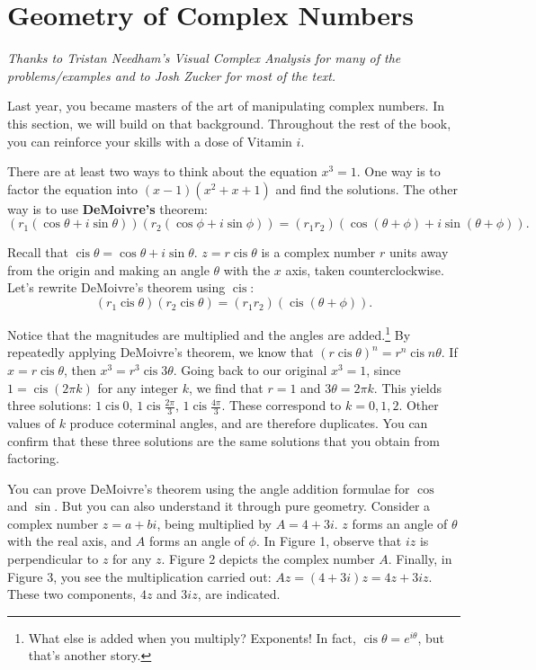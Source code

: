 \documentclass[../gatm.tex]{subfiles}
\begin{document}

\section{Geometry of Complex Numbers}

\newcommand{\Arg} {\operatorname{Arg}}
\newcommand{\cis} {\operatorname{cis}}
\newcommand{\Real} {\operatorname{Re}}
\newcommand{\Imag} {\operatorname{Im}}

\textit{Thanks to Tristan Needham's \emph{Visual Complex Analysis} for many of the problems/examples and to Josh Zucker for most of the text.}

Last year, you became masters of the art of manipulating complex numbers. In this section, we will build on that background. Throughout the rest of the book, you can reinforce your skills with a dose of Vitamin $i$.

There are at least two ways to think about the equation $x^3 = 1$. One way is to factor the equation into $(x-1)(x^2+x+1)$ and find the solutions. The other way is to use \textbf{DeMoivre’s} theorem:
\[(r_1 (\cos \theta + i \sin \theta)) (r_2 (\cos \phi + i \sin \phi)) = (r_1r_2) (\cos(\theta + \phi) + i \sin(\theta + \phi)).\]

Recall that $\cis \theta = \cos \theta + i \sin \theta$. $z=r\cis \theta$ is a complex number $r$ units away from the origin and making an angle $\theta$ with the $x$ axis, taken counterclockwise. Let’s rewrite DeMoivre’s theorem using $\cis$:
\[(r_1 \cis \theta)(r_2 \cis \theta) = (r_1r_2)(\cis(\theta + \phi)).\]

Notice that the magnitudes are multiplied and the angles are added.\footnote{What else is added when you multiply? Exponents! In fact, $\cis \theta = e^{i\theta}$, but that’s another story.} By repeatedly applying DeMoivre's theorem, we know that $(r \cis \theta) ^ n = r^n \cis n\theta$. If $x = r \cis \theta$, then $x^3 = r^3 \cis 3\theta$. Going back to our original $x^3 = 1$, since $1 = \cis(2\pi k)$ for any integer $k$, we find that $r = 1$ and $3\theta = 2\pi k$. This yields three solutions: $1 \cis 0$, $1 \cis \frac{2\pi}{3}$, $1 \cis \frac{4\pi}{3}$. These correspond to $k = 0, 1, 2$. Other values of $k$ produce coterminal angles, and are therefore duplicates. You can confirm that these three solutions are the same solutions that you obtain from factoring.

You can prove DeMoivre’s theorem using the angle addition formulae for $\cos$ and $\sin$. But you can also understand it through pure geometry. Consider a complex number $z = a + bi$, being multiplied by $A = 4 + 3i$. $z$ forms an angle of $\theta$ with the real axis, and $A$ forms an angle of $\phi$. In Figure 1, observe that $iz$ is perpendicular to $z$ for any $z$. Figure 2 depicts the complex number $A$. Finally, in Figure 3, you see the multiplication carried out: $Az = (4+3i)z = 4z + 3iz$. These two components, $4z$ and $3iz$, are indicated.
\end{document}
